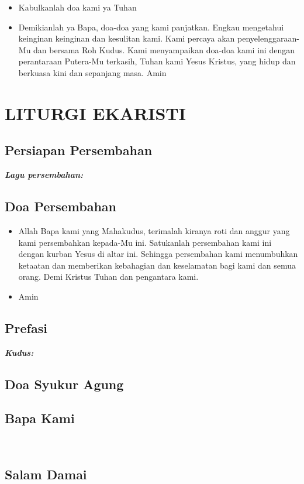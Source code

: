 \documentclass[a5paper,headsepline,titlepage,11pt,nnormalheadings]{scrbook}
\makeatletter
\newcommand{\BU}[1]{\begin{itemize} \item[U:] #1 \end{itemize}}
\newcommand{\BI}[1]{\begin{itemize} \item[I:] #1 \end{itemize}}
\newcommand{\lagupersembahan}{~ }
\newcommand{\lagusanctus}{~ }
\newcommand{\lagubapakami}{~ }
\newcommand{\lagu}[1]{%
  {\parindent \z@ \normalfont
    \interlinepenalty\@M \bfseries \emph{#1}\par\nobreak \vskip 20\p@ }}
\makeatother
\begin{document}
\BU{Kabulkanlah doa kami ya Tuhan}

\BI{Demikianlah ya Bapa, doa-doa yang kami panjatkan. Engkau mengetahui keinginan keinginan dan kesulitan kami. Kami percaya akan penyelenggaraan-Mu dan bersama Roh Kudus. Kami menyampaikan doa-doa kami ini dengan perantaraan Putera-Mu terkasih, Tuhan kami Yesus Kristus, yang hidup dan berkuasa kini dan sepanjang masa. Amin}

\section*{LITURGI EKARISTI}

\subsection*{Persiapan Persembahan}

\lagu{Lagu persembahan: \lagupersembahan}

\subsection*{Doa Persembahan}

\BI{Allah Bapa kami yang Mahakudus, terimalah kiranya roti dan anggur yang kami persembahkan kepada-Mu ini. Satukanlah persembahan kami ini dengan kurban Yesus di altar ini. Sehingga persembahan kami menumbuhkan ketaatan dan memberikan kebahagian dan keselamatan bagi kami dan semua orang. Demi Kristus Tuhan dan pengantara kami.}

\BU{Amin}

\subsection*{Prefasi}

\lagu{Kudus: \lagusanctus}

\subsection*{Doa Syukur Agung}

\subsection*{Bapa Kami}
\lagu{\lagubapakami}

\subsection*{Salam Damai}
\end{document}
